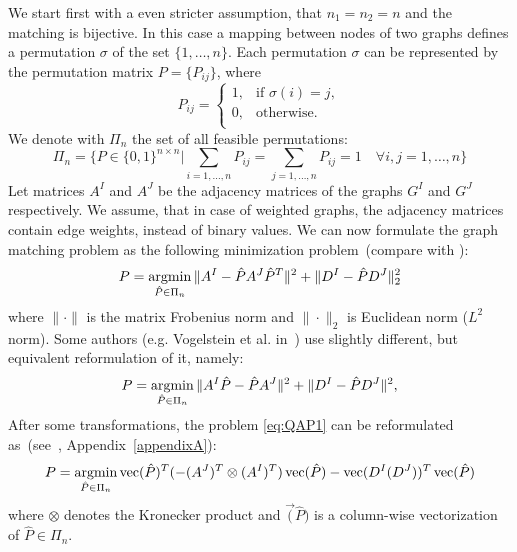 We start first with a even stricter assumption, that $n_1=n_2=n$ and the matching is bijective. In this case a mapping between nodes of two graphs defines a permutation $\sigma$ of the set $\{1,\dots,n\}$. Each permutation $\sigma$ can be represented by the permutation matrix $P=\{P_{ij}\}$, where
\begin{equation*}
P_{ij}=\begin{cases}
 1, & \text{if } \sigma(i)=j, \\
 0, & \text{otherwise.} \\
\end{cases}
\end{equation*}
We denote with $\Pi_n$ the set of all feasible permutations:
\begin{equation*}
\Pi_n=\{P\in\{0,1\}^{n\times n}|\sum_{i=1,\dots,n}P_{ij}=\sum_{j=1,\dots,n}P_{ij}=1\quad\forall i,j=1,\dots,n\}
\end{equation*}
Let matrices $A^I$ and $A^J$ be the adjacency matrices of the graphs $G^I$ and $G^J$ respectively. We assume, that in case of weighted graphs, the adjacency matrices contain edge weights, instead of binary values. We can now formulate the graph matching problem as the following minimization problem~(compare with \cite{Herault1990_SimulatedAnnealing,FastPFP,Lyzinski2015,Roth2001,Umeyam1988,Zazlavskiy2008_PATH}):
\begin{equation} \label{eq:QAP1}
P = \mathop{\rm argmin}_{\hat{P}\in\Pi_n}\|A^I-\hat{P}A^J\hat{P}^T\|^2+\|D^I-\hat{P}D^J\|^2_2
\end{equation}
where $\|\cdot\|$ is the matrix Frobenius norm and $\|\cdot\|_2$ is Euclidean norm ($L^2$ norm). Some authors (e.g. Vogelstein et al. in~\cite{Vogelstein_BrainGraphs}) use slightly different, but equivalent reformulation of it, namely:
\begin{equation} \label{eq:QAP2}
P = \mathop{\rm argmin}_{\hat{P}\in\Pi_n}\|A^I\hat{P}-\hat{P}A^J\|^2+\|D^I-\hat{P}D^J\|^2,
\end{equation}
After some transformations, the problem \eqref{eq:QAP1} can be reformulated as~(see~\cite{Burkard98thequadratic}, Appendix~\ref{appendixA}):
\begin{equation} \label{eq:QAP3}
P = \mathop{\rm argmin}_{\hat{P}\in\Pi_n}\mathop{\rm vec}(\hat{P})^T(-(A^J)^T\otimes(A^I)^T)\mathop{\rm vec}(\hat{P})-\mathop{\rm vec}(D^I(D^J))^T\mathop{\rm vec}(\hat{P})
\end{equation}
where $\otimes$ denotes the Kronecker product and $\vec(\hat{P})$ is a column-wise vectorization of $\hat{P}\in\Pi_n$.

